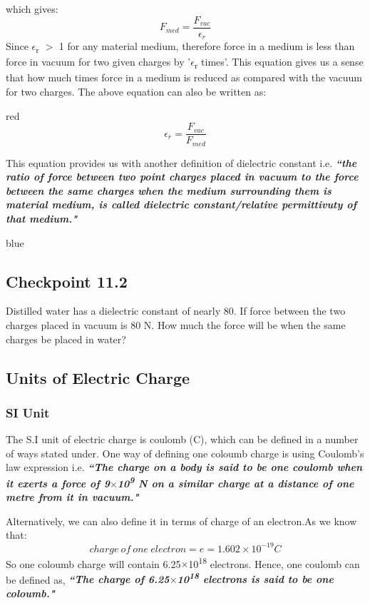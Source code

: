 which gives:
\begin{equation}\label{eq:11.11}
  F_{med} = \frac{F_{vac}}{\epsilon_{r}}
\end{equation}
Since $\epsilon$\textsubscript{r} $>$ 1 for any material medium, therefore force in a medium
is less than force in vacuum for two given charges by '$\epsilon$\textsubscript{r} times'.
This equation gives us a sense that how much times force in a medium is reduced as compared with the vacuum for two charges.
The above equation can also be written as:
\begin{mybox}{red}{}
\begin{equation}\label{eq:11.12}
  \epsilon_{r} = \frac{F_{vac}}{F_{med}}
\end{equation}
\end{mybox}
This equation provides us with another definition of dielectric constant
i.e. \textit{\textbf{``the ratio of force between two point charges placed in vacuum
to the force between the same charges when the medium surrounding
them is material medium,
is called dielectric constant/relative permittivuty of that medium."}}
\begin{mybox}{blue}{}
  \subsection*{Checkpoint 11.2}
  Distilled water has a dielectric constant of nearly 80.
  If force between the two charges placed in vacuum is 80 N.
  How much the force will be when the same charges be placed in water?
\end{mybox}
\subsection{Units of Electric Charge}
\subsubsection{SI Unit}
The S.I unit of electric charge is coulomb (C), which can be defined in a
number of ways stated under.
One way of defining one coloumb charge is using Coulomb’s law
expression i.e. \textit{\textbf{``The charge on a body is said to be one coulomb when it exerts
a force of 9$\times$10\textsuperscript{9} N on a similar charge at a distance
of one metre from it in vacuum."}}

Alternatively, we can also define it in terms of charge of an electron.As we know that:
\begin{equation}
  charge\:of\:one\:electron = e = 1.602\times10^{-19} C \nonumber
\end{equation}
So one coloumb charge will contain 6.25$\times$10\textsuperscript{18} electrons.
Hence, one coulomb can be defined as, 
\textit{\textbf{``The charge of 6.25$\times$10\textsuperscript{18} electrons
is said to be one coloumb."}}

